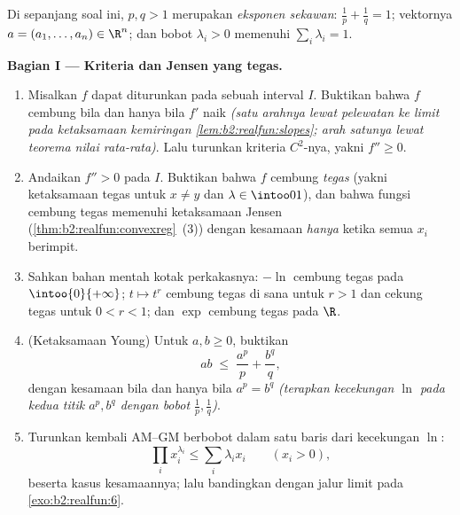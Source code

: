 \begin{problem}
\label{pb:b2:realfun:1}
Di sepanjang soal ini, $p, q > 1$ merupakan \emph{eksponen sekawan}:
$\frac1p + \frac1q = 1$; vektornya $a = (a_1, \dots, a_n) \in \R^n$;
dan bobot $\lambda_i > 0$ memenuhi $\sum_i\lambda_i = 1$.

\medskip
\noindent\textbf{Bagian I --- Kriteria dan Jensen yang tegas.}
\begin{enumerate}
  \item Misalkan $f$ dapat diturunkan pada sebuah interval $I$.
        Buktikan bahwa $f$ cembung bila dan hanya bila $f'$ naik
        \emph{(satu arahnya lewat pelewatan ke limit pada
        ketaksamaan kemiringan \cref{lem:b2:realfun:slopes};
        arah satunya lewat teorema nilai rata-rata)}. Lalu turunkan
        kriteria $C^2$-nya, yakni $f'' \geq 0$.
  \item Andaikan $f''> 0$ pada $I$. Buktikan bahwa $f$ cembung
        \emph{tegas} (yakni ketaksamaan tegas untuk $x \neq y$
        dan $\lambda \in \intoo01$), dan bahwa fungsi cembung tegas
        memenuhi ketaksamaan Jensen
        (\cref{thm:b2:realfun:convexreg}~(3)) dengan kesamaan
        \emph{hanya} ketika semua $x_i$ berimpit.
  \item Sahkan bahan mentah kotak perkakasnya: $-\ln$ cembung
        tegas pada $\intoo{0}{+\infty}$; $t \mapsto t^r$ cembung
        tegas di sana untuk $r > 1$ dan cekung tegas
        untuk $0 < r < 1$; dan $\exp$ cembung tegas pada $\R$.
  \item (Ketaksamaan Young) Untuk $a, b \geq 0$, buktikan
        \[
        ab \;\leq\; \frac{a^p}{p} + \frac{b^q}{q},
        \]
        dengan kesamaan bila dan hanya bila $a^p = b^q$ \emph{(terapkan
        kecekungan $\ln$ pada kedua titik $a^p, b^q$
        dengan bobot $\frac1p, \frac1q$)}.
  \item Turunkan kembali AM--GM berbobot dalam satu baris dari
        kecekungan $\ln$:
        \[
        \prod_i x_i^{\lambda_i} \leq \sum_i\lambda_ix_i \qquad
        (x_i > 0),
        \]
        beserta kasus kesamaannya; lalu bandingkan dengan jalur limit
        pada \cref{exo:b2:realfun:6}.
\end{enumerate}


\end{problem}
